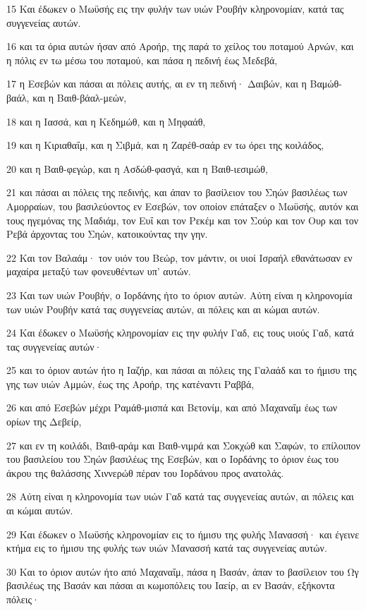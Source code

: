 \par 15 Και έδωκεν ο Μωϋσής εις την φυλήν των υιών Ρουβήν κληρονομίαν, κατά τας συγγενείας αυτών.
\par 16 και τα όρια αυτών ήσαν από Αροήρ, της παρά το χείλος του ποταμού Αρνών, και η πόλις εν τω μέσω του ποταμού, και πάσα η πεδινή έως Μεδεβά,
\par 17 η Εσεβών και πάσαι αι πόλεις αυτής, αι εν τη πεδινή· Δαιβών, και η Βαμώθ-βαάλ, και η Βαιθ-βάαλ-μεών,
\par 18 και η Ιασσά, και η Κεδημώθ, και η Μηφαάθ,
\par 19 και η Κιριαθαΐμ, και η Σιβμά, και η Ζαρέθ-σαάρ εν τω όρει της κοιλάδος,
\par 20 και η Βαιθ-φεγώρ, και η Ασδώθ-φασγά, και η Βαιθ-ιεσιμώθ,
\par 21 και πάσαι αι πόλεις της πεδινής, και άπαν το βασίλειον του Σηών βασιλέως των Αμορραίων, του βασιλεύοντος εν Εσεβών, τον οποίον επάταξεν ο Μωϋσής, αυτόν και τους ηγεμόνας της Μαδιάμ, τον Ευΐ και τον Ρεκέμ και τον Σούρ και τον Ουρ και τον Ρεβά άρχοντας του Σηών, κατοικούντας την γην.
\par 22 Και τον Βαλαάμ· τον υιόν του Βεώρ, τον μάντιν, οι υιοί Ισραήλ εθανάτωσαν εν μαχαίρα μεταξύ των φονευθέντων υπ' αυτών.
\par 23 Και των υιών Ρουβήν, ο Ιορδάνης ήτο το όριον αυτών. Αύτη είναι η κληρονομία των υιών Ρουβήν κατά τας συγγενείας αυτών, αι πόλεις και αι κώμαι αυτών.
\par 24 Και έδωκεν ο Μωϋσής κληρονομίαν εις την φυλήν Γαδ, εις τους υιούς Γαδ, κατά τας συγγενείας αυτών·
\par 25 και το όριον αυτών ήτο η Ιαζήρ, και πάσαι αι πόλεις της Γαλαάδ και το ήμισυ της γης των υιών Αμμών, έως της Αροήρ, της κατέναντι Ραββά,
\par 26 και από Εσεβών μέχρι Ραμάθ-μισπά και Βετονίμ, και από Μαχαναΐμ έως των ορίων της Δεβείρ,
\par 27 και εν τη κοιλάδι, Βαιθ-αράμ και Βαιθ-νιμρά και Σοκχώθ και Σαφών, το επίλοιπον του βασιλείου του Σηών βασιλέως της Εσεβών, και ο Ιορδάνης το όριον έως του άκρου της θαλάσσης Χιννερώθ πέραν του Ιορδάνου προς ανατολάς.
\par 28 Αύτη είναι η κληρονομία των υιών Γαδ κατά τας συγγενείας αυτών, αι πόλεις και αι κώμαι αυτών.
\par 29 Και έδωκεν ο Μωϋσής κληρονομίαν εις το ήμισυ της φυλής Μανασσή· και έγεινε κτήμα εις το ήμισυ της φυλής των υιών Μανασσή κατά τας συγγενείας αυτών.
\par 30 Και το όριον αυτών ήτο από Μαχαναΐμ, πάσα η Βασάν, άπαν το βασίλειον του Ωγ βασιλέως της Βασάν και πάσαι αι κωμοπόλεις του Ιαείρ, αι εν Βασάν, εξήκοντα πόλεις·
